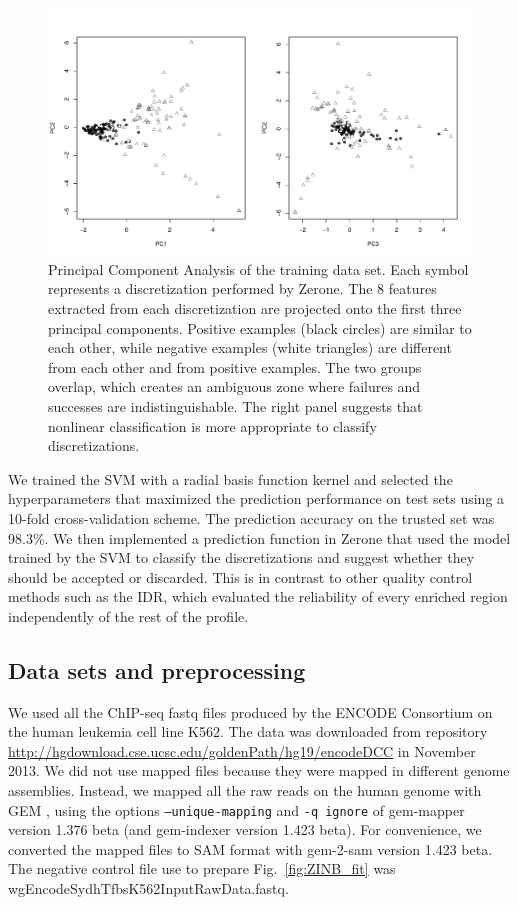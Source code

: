 \documentclass{bioinfo}
\begin{document}
\begin{methods}
\begin{figure}[!tpb]
\centerline{\includegraphics[scale=0.282]{pca_bw.pdf}}
\caption{
  Principal Component Analysis of the training data set.
  Each symbol represents a discretization performed by Zerone. The
  8 features extracted from each discretization are projected onto
  the first three principal components. Positive examples (black
  circles) are similar to each other, while negative examples (white
  triangles) are different from each other and from positive examples.
  The two groups overlap, which creates an ambiguous zone where
  failures and successes are indistinguishable. The right panel
  suggests that nonlinear classification is more appropriate to
  classify discretizations.
}\label{fig:pca_bw}
\end{figure}

We trained the SVM with a radial basis function kernel and
selected the hyperparameters that maximized the prediction
performance on test sets using a 10-fold cross-validation scheme.
The prediction accuracy on the trusted set was 98.3\%.
We then implemented a prediction function in Zerone that used the
model trained by the SVM to classify the discretizations and
suggest whether they should be accepted or discarded.
This is in contrast to other quality control methods such as the IDR, which
evaluated the reliability of every enriched region independently of the rest
of the profile.

\subsection{Data sets and preprocessing}
We used all the ChIP-seq fastq files produced by the ENCODE Consortium
on the human leukemia cell line K562. The data was
downloaded from repository
\href{http://hgdownload.cse.ucsc.edu/goldenPath/hg19/encodeDCC}{http://hgdownload.cse.ucsc.edu/goldenPath/hg19/encodeDCC} in November 2013.
We did not use mapped files because they were mapped in different
genome assemblies.
Instead, we mapped all the raw reads on the human genome with GEM
\citep{pmid23103880}, using the options \texttt{--unique-mapping} and
\texttt{-q ignore} of gem-mapper version 1.376 beta (and gem-indexer version
1.423 beta).
For convenience, we converted the mapped files to SAM format with
gem-2-sam version 1.423 beta.
The negative control file use to prepare Fig.~\ref{fig:ZINB_fit}
was wgEncodeSydhTfbsK562InputRawData.fastq.


\end{methods}
\end{document}
